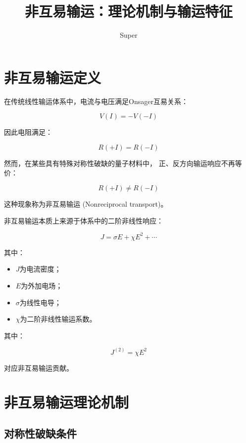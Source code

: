 \documentclass[10.5pt]{article}
\title{\textbf{非互易输运：理论机制与输运特征}}
\author{Super}
\date{}
\begin{document}
\maketitle


\section{非互易输运定义}

在传统线性输运体系中，电流与电压满足Onsager互易关系：

\begin{equation}
V(I)=-V(-I)
\end{equation}

因此电阻满足：

\begin{equation}
R(+I)=R(-I)
\end{equation}


然而，在某些具有特殊对称性破缺的量子材料中，
正、反方向输运响应不再等价：

\begin{equation}
R(+I)\neq R(-I)
\end{equation}

这种现象称为非互易输运
(Nonreciprocal transport)。


非互易输运本质上来源于体系中的二阶非线性响应：

\begin{equation}
J=\sigma E+\chi E^2+\cdots
\end{equation}


其中：

\begin{itemize}
\item $J$为电流密度；
\item $E$为外加电场；
\item $\sigma$为线性电导；
\item $\chi$为二阶非线性输运系数。
\end{itemize}


其中：

\begin{equation}
J^{(2)}=\chi E^2
\end{equation}

对应非互易输运贡献。



\section{非互易输运理论机制}


\subsection{对称性破缺条件}
\end{document}
